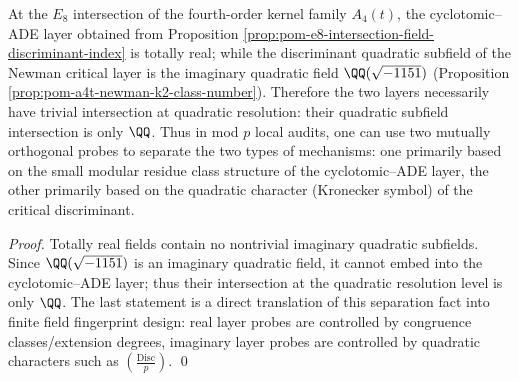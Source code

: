 \begin{corollary}[\texorpdfstring{$q=4$}{q=4} cyclotomic--ADE layer and Newman critical layer: real/imaginary separation at quadratic resolution]\label{cor:pom-q4-arithmetic-two-layer-real-imag}
At the \(E_8\) intersection of the fourth-order kernel family \(A_4(t)\), the cyclotomic--ADE layer obtained from Proposition \ref{prop:pom-e8-intersection-field-discriminant-index} is totally real;
while the discriminant quadratic subfield of the Newman critical layer is the imaginary quadratic field \(\QQ(\sqrt{-1151})\) (Proposition \ref{prop:pom-a4t-newman-k2-class-number}).
Therefore the two layers necessarily have trivial intersection at quadratic resolution: their quadratic subfield intersection is only \(\QQ\).
Thus in mod \(p\) local audits, one can use two mutually orthogonal probes to separate the two types of mechanisms: one primarily based on the small modular residue class structure of the cyclotomic--ADE layer, the other primarily based on the quadratic character (Kronecker symbol) of the critical discriminant.
\end{corollary}
\begin{proof}
Totally real fields contain no nontrivial imaginary quadratic subfields.
Since \(\QQ(\sqrt{-1151})\) is an imaginary quadratic field, it cannot embed into the cyclotomic--ADE layer;
thus their intersection at the quadratic resolution level is only \(\QQ\).
The last statement is a direct translation of this separation fact into finite field fingerprint design: real layer probes are controlled by congruence classes/extension degrees, imaginary layer probes are controlled by quadratic characters such as \(\left(\frac{\mathrm{Disc}}{p}\right)\). \qed
\end{proof}

